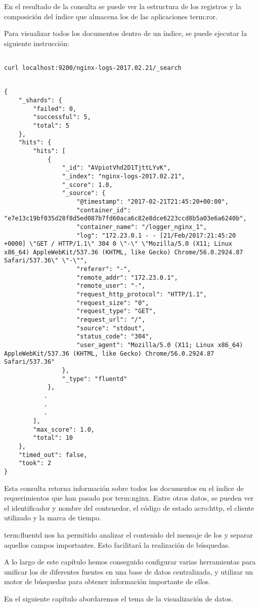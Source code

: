 En el resultado de la consulta se puede ver la estructura de los registros y la
composición del índice que almacena los  de las aplicaciones
\gls{term:ror}.

Para visualizar todos los documentos dentro de un índice, se puede ejecutar la
siguiente instrucción:

\begin{lstlisting}

curl localhost:9200/nginx-logs-2017.02.21/_search

\end{lstlisting}

\begin{lstlisting}

{
    "_shards": {
        "failed": 0,
        "successful": 5,
        "total": 5
    },
    "hits": {
        "hits": [
            {
                "_id": "AVpiotVhd2D1TjttLYvK",
                "_index": "nginx-logs-2017.02.21",
                "_score": 1.0,
                "_source": {
                    "@timestamp": "2017-02-21T21:45:20+00:00",
                    "container_id": "e7e13c19bf035d28f8d5ed087b7fd60aca6c82e8dce6223ccd8b5a03e6a6240b",
                    "container_name": "/logger_nginx_1",
                    "log": "172.23.0.1 - - [21/Feb/2017:21:45:20 +0000] \"GET / HTTP/1.1\" 304 0 \"-\" \"Mozilla/5.0 (X11; Linux x86_64) AppleWebKit/537.36 (KHTML, like Gecko) Chrome/56.0.2924.87 Safari/537.36\" \"-\"",
                    "referer": "-",
                    "remote_addr": "172.23.0.1",
                    "remote_user": "-",
                    "request_http_protocol": "HTTP/1.1",
                    "request_size": "0",
                    "request_type": "GET",
                    "request_url": "/",
                    "source": "stdout",
                    "status_code": "304",
                    "user_agent": "Mozilla/5.0 (X11; Linux x86_64) AppleWebKit/537.36 (KHTML, like Gecko) Chrome/56.0.2924.87 Safari/537.36"
                },
                "_type": "fluentd"
            },
           .
           .
           .
        ],
        "max_score": 1.0,
        "total": 10
    },
    "timed_out": false,
    "took": 2
}

\end{lstlisting}

Esta consulta retorna información sobre todos los documentos en el índice
de requerimientos  que han pasado por \gls{term:nginx}. Entre
otros datos, se pueden ver el identificador y nombre del contenedor, el código
de estado \gls{acro:http}, el cliente  utilizado y la marca de
tiempo.

\gls{term:fluentd} nos ha permitido analizar el contenido del mensaje de los
 y separar aquellos campos importantes. Esto facilitará la realización de
búsquedas.

A lo largo de este capítulo hemos conseguido configurar varias herramientas
para unificar los  de diferentes fuentes en una base de datos
centralizada, y utilizar un motor de búsquedas para obtener información
importante de ellos.

En el siguiente capítulo abordaremos el tema de la visualización de datos.
